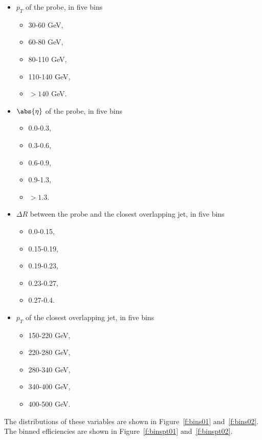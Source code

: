 \begin{itemize}[label=]
	\item $p_T$ of the probe, in five bins
	      \begin{itemize}
		      \item 30-60 GeV,
		      \item 60-80 GeV,
		      \item 80-110 GeV,
		      \item 110-140 GeV,
		      \item $> 140$ GeV.
	      \end{itemize}
	\item $\abs{\eta}$ of the probe, in five bins
	      \begin{itemize}
		      \item 0.0-0.3,
		      \item 0.3-0.6,
		      \item 0.6-0.9,
		      \item 0.9-1.3,
		      \item $> 1.3$.
	      \end{itemize}
	\item $\Delta R $ between the probe and the closest overlapping jet, in five bins
	      \begin{itemize}
		      \item 0.0-0.15,
		      \item 0.15-0.19,
		      \item 0.19-0.23,
		      \item 0.23-0.27,
		      \item 0.27-0.4.
	      \end{itemize}
	\item $p_T$ of the closest overlapping jet, in five bins
	      \begin{itemize}
		      \item 150-220 GeV,
		      \item 220-280 GeV,
		      \item 280-340 GeV,
		      \item 340-400 GeV,
		      \item 400-500 GeV.
	      \end{itemize}
\end{itemize}

The distributions of these variables are shown in Figure~\ref{f:bins01} and~\ref{f:bins02}.
The binned efficiencies are shown in Figure~\ref{f:binspt01} and~\ref{f:binspt02}.


